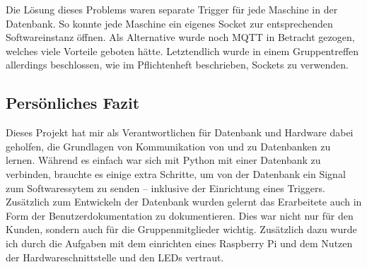 Die Lösung dieses Problems waren separate Trigger für jede Maschine in der Datenbank. So konnte jede Maschine ein eigenes Socket zur entsprechenden Softwareinstanz öffnen. Als Alternative wurde noch MQTT in Betracht gezogen, welches viele Vorteile geboten hätte. Letztendlich wurde in einem Gruppentreffen allerdings beschlossen, wie im Pflichtenheft beschrieben, Sockets zu verwenden. 

\subsection{Persönliches Fazit}
Dieses Projekt hat mir als Verantwortlichen für Datenbank und Hardware dabei geholfen, die Grundlagen von Kommunikation von und zu Datenbanken zu lernen. Während es einfach war sich mit Python mit einer Datenbank zu verbinden, brauchte es einige extra Schritte, um von der Datenbank ein Signal zum Softwaressytem zu senden -- inklusive der Einrichtung eines Triggers. Zusätzlich zum Entwickeln der Datenbank wurden gelernt das Erarbeitete auch in Form der Benutzerdokumentation zu dokumentieren. Dies war nicht nur für den Kunden, sondern auch für die Gruppenmitglieder wichtig. Zusätzlich dazu wurde ich durch die Aufgaben mit dem einrichten eines Raspberry Pi und dem Nutzen der Hardwareschnittstelle und den LEDs vertraut.

